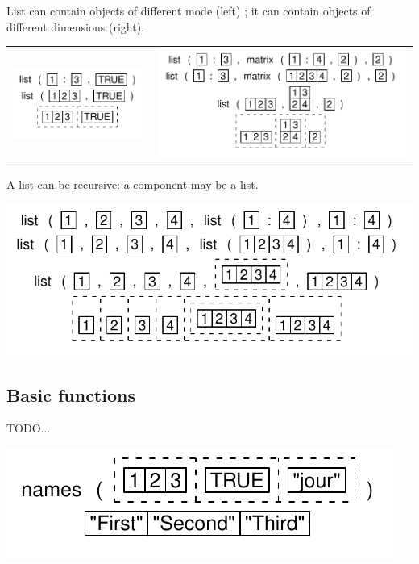 \documentclass[pdflatex]{article}
\begin{document}
% 

List can contain objects of different mode (left) ;
it can contain objects of different dimensions (right).

\begin{tabular}{cc}
\includegraphics{list_twotypes.pdf} & \includegraphics{list_matrix.pdf}
\end{tabular}

A list can be recursive: a component may be a list.

\includegraphics{list_complex.pdf}


\subsection{Basic functions}

TODO...

\includegraphics{list_names}
\end{document}
